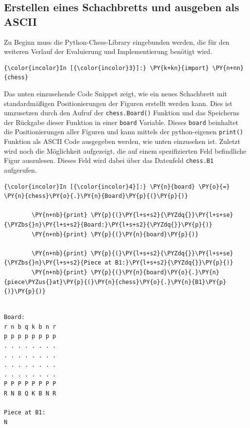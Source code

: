     \subsection{Erstellen eines Schachbretts und ausgeben als
ASCII}\label{erstellen-eines-schachbretts-und-ausgeben-als-ascii}

Zu Beginn muss die Python-Chess-Library eingebunden werden, die für den
weiteren Verlauf der Evaluierung und Implementierung benötigt wird.

    \begin{Verbatim}[commandchars=\\\{\}]
{\color{incolor}In [{\color{incolor}3}]:} \PY{k+kn}{import} \PY{n+nn}{chess}
\end{Verbatim}


    Das unten einzusehende Code Snippet zeigt, wie ein neues Schachbrett mit
standardmäßigen Positionierungen der Figuren erstellt werden kann. Dies
ist umzusetzen durch den Aufruf der \texttt{chess.Board()} Funktion und
das Speicherns der Rückgabe dieser Funktion in einer \texttt{board}
Variable. Dieses \texttt{board} beinhaltet die Positionierungen aller
Figuren und kann mittels der python-eigenen \texttt{print()} Funktion
als ASCII Code ausgegeben werden, wie unten einzusehen ist. Zuletzt wird
noch die Möglichkeit aufgezeigt, die auf einem spezifizierten Feld
befindliche Figur auszulesen. Dieses Feld wird dabei über das Datenfeld
\texttt{chess.B1} aufgerufen.

    \begin{Verbatim}[commandchars=\\\{\}]
{\color{incolor}In [{\color{incolor}4}]:} \PY{n}{board} \PY{o}{=} \PY{n}{chess}\PY{o}{.}\PY{n}{Board}\PY{p}{(}\PY{p}{)}
            
        \PY{n+nb}{print} \PY{p}{(}\PY{l+s+s2}{\PYZdq{}}\PY{l+s+se}{\PYZbs{}n}\PY{l+s+s2}{Board:}\PY{l+s+s2}{\PYZdq{}}\PY{p}{)}
        \PY{n+nb}{print} \PY{p}{(}\PY{n}{board}\PY{p}{)}
        
        \PY{n+nb}{print} \PY{p}{(}\PY{l+s+s2}{\PYZdq{}}\PY{l+s+se}{\PYZbs{}n}\PY{l+s+s2}{Piece at B1:}\PY{l+s+s2}{\PYZdq{}}\PY{p}{)}
        \PY{n+nb}{print} \PY{p}{(}\PY{n}{board}\PY{o}{.}\PY{n}{piece\PYZus{}at}\PY{p}{(}\PY{n}{chess}\PY{o}{.}\PY{n}{B1}\PY{p}{)}\PY{p}{)}
\end{Verbatim}

    \begin{Verbatim}[commandchars=\\\{\}]

Board:
r n b q k b n r
p p p p p p p p
. . . . . . . .
. . . . . . . .
. . . . . . . .
. . . . . . . .
P P P P P P P P
R N B Q K B N R

Piece at B1:
N

    \end{Verbatim}

